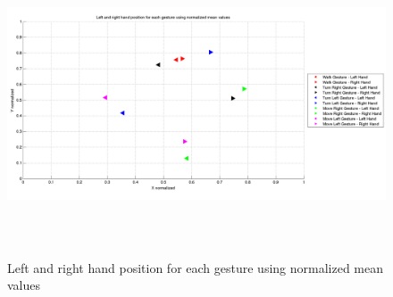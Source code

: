 \begin{figure}
	\hspace{-10 mm}
	\includegraphics[height=90mm]{figures/result/train-all-ges-mean.png} \caption{Left and right hand position for each gesture using normalized mean values} \label{fg:ev:mean} 
\end{figure}
